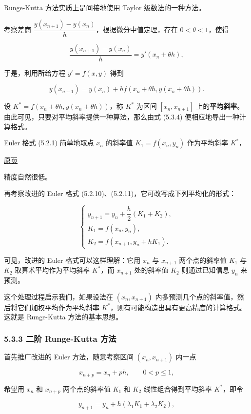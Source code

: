 \documentclass[
  10pt,
  fontset=fandol]{ctexart}
\begin{document}
Runge-Kutta 方法实质上是间接地使用 Taylor 级数法的一种方法。

考察差商 \(\dfrac{y(x_{n+1})-y(x_n)}{h}\)，根据微分中值定理，存在 \(0<\theta<1\)，使得

\[
\frac{y(x_{n+1})-y(x_n)}{h}=y'(x_n+\theta h),
\]

于是，利用所给方程 \(y'=f(x,y)\) 得到

\[
y(x_{n+1})=y(x_n)+hf(x_n+\theta h,y(x_n+\theta h)).\tag{5.3.4}
\]

设 \(K^*=f(x_n+\theta h,y(x_n+\theta h))\)，称 \(K^*\) 为区间 \([x_n,x_{n+1}]\) 上的\textbf{平均斜率}。由此可见，只要对平均斜率提供一种算法，那么由式 (5.3.4) 便相应地导出一种计算格式。

Euler 格式 (5.2.1) 简单地取点 \(x_n\) 的斜率值 \(K_1=f(x_n,y_n)\) 作为平均斜率 \(K^*\)，

\href{../../source-images/pdf-128.jpeg}{原页}

精度自然很低。

再考察改进的 Euler 格式 (5.2.10)、(5.2.11)，它可改写成下列平均化的形式：

\[
\begin{cases}
y_{n+1}=y_n+\dfrac{h}{2}(K_1+K_2),\\
K_1=f(x_n,y_n),\\
K_2=f(x_{n+1},y_n+hK_1).
\end{cases}
\]

可见，改进的 Euler 格式可以这样理解：它用 \(x_n\) 与 \(x_{n+1}\) 两个点的斜率值 \(K_1\) 与 \(K_2\) 取算术平均作为平均斜率 \(K^*\)，而 \(x_{n+1}\) 处的斜率值 \(K_2\) 则通过已知信息 \(y_n\) 来预测。

这个处理过程启示我们，如果设法在 \((x_n,x_{n+1})\) 内多预测几个点的斜率值，然后将它们加权平均作为平均斜率 \(K^*\)，则有可能构造出具有更高精度的计算格式。这就是 Runge-Kutta 方法的基本思想。

\subsubsection{5.3.3 二阶 Runge-Kutta 方法}\label{ux4e8cux9636-runge-kutta-ux65b9ux6cd5}

首先推广改进的 Euler 方法，随意考察区间 \((x_n,x_{n+1})\) 内一点

\[
x_{n+p}=x_n+ph,\qquad 0<p\leqslant1,
\]

希望用 \(x_n\) 和 \(x_{n+p}\) 两个点的斜率值 \(K_1\) 和 \(K_2\) 线性组合得到平均斜率 \(K^*\)，即令

\[
y_{n+1}=y_n+h(\lambda_1K_1+\lambda_2K_2),
\]
\end{document}
